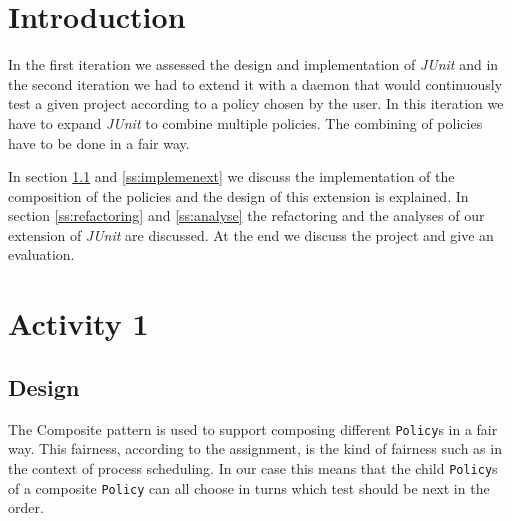 \documentclass[i3]{oss}
\newcommand{\class}[1]{\texttt{#1}}
\newcommand{\junit}{\emph{JUnit }}
\begin{document}

\maketitlepage
\newpage
\tableofcontents
\pagebreak




\section*{Introduction}
\label{ssec:introduction}
In the first iteration we assessed the design and implementation of \junit and in the second iteration we had to extend it with a daemon that would continuously test a given project according to a policy chosen by the user.
In this iteration we have to expand \junit to combine multiple policies. The combining of policies have to be done in a fair way.

In section \ref{ss:designext} and \ref{ss:implemenext} we discuss the implementation of the composition of the policies and the design of this extension is explained.
In section \ref{ss:refactoring} and \ref{ss:analyse} the refactoring and the analyses of our extension of \junit are discussed. 
At the end we discuss the project and give an evaluation.

\section{Activity 1}
\subsection{Design}
\label{ss:designext}

The Composite pattern is used to support composing different \class{Policy}s in a fair way.
This fairness, according to the assignment, is the kind of fairness such as in the context of process scheduling.
In our case this means that the child \class{Policy}s of a composite \class{Policy} can all choose in turns which test should be next in the order.  
\end{document}

